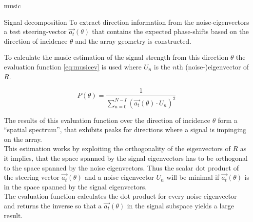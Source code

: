 \begin{subchapter}{\acrshort{music}}
\begin{subsubchapter}{Signal decomposition}
    To extract direction information from the noise-eigenvectors
    a test steering-vector $\vec{a_{t}}(\theta)$ that contains
    the expected phase-shifts based on the direction of incidence
    $\theta$ and the array geometry is constructed.

    To calculate the \gls{music} estimation of the signal strength from
    this direction $\theta$ the evaluation function \ref{eq:musicev}
    is used \cite[p. 12]{girdmusic} where $U_{n}$ is the $n$th
    (noise-)eigenvector of $R$.

    \begin{equation}
      \label{eq:musicev}
      P(\theta)= \frac{1}{
        \sum_{n=0}^{N-I} \left( \vec{a_{t}}(\theta) \cdot U_{n} \right)^2
      }
    \end{equation}

    The results of this evaluation function over the direction
    of incidence $\theta$ form a ``spatial spectrum'', that exhibits
    peaks for directions where a signal is impinging on the array. \\

    This estimation works by exploiting the orthogonality of the
    eigenvectors of $R$ as it implies, that the space spanned by
    the signal eigenvectors has to be orthogonal to the space spanned
    by the noise eigenvectors.
    Thus the scalar dot product of the steering vector $\vec{a_{t}}(\theta)$
    and a noise eigenvector $U_{n}$ will be minimal if
    $\vec{a_{t}}(\theta)$ is in the space spanned by the signal
    eigenvectors. \\

    The evaluation function calculates the dot product for every
    noise eigenvector and returns the inverse so that a
    $\vec{a_{t}}(\theta)$ in the signal subspace yields a large
    result.
  \end{subsubchapter}
\end{subchapter}
